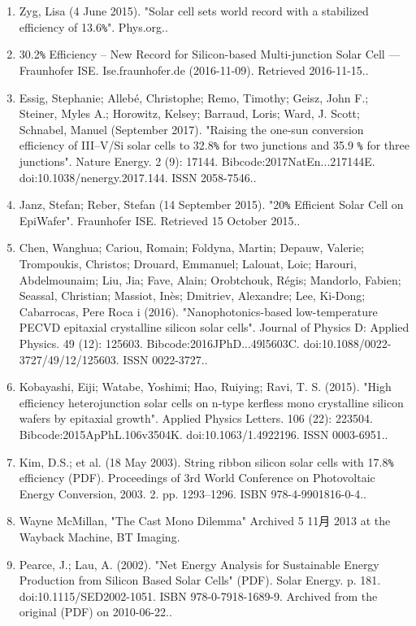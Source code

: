 \begin{enumerate}
\item Zyg, Lisa (4 June 2015). "Solar cell sets world record with a stabilized efficiency of 13.6\verb`%`". Phys.org..
\item 30.2\verb`%` Efficiency – New Record for Silicon-based Multi-junction Solar Cell — Fraunhofer ISE. Ise.fraunhofer.de (2016-11-09). Retrieved 2016-11-15..
\item Essig, Stephanie; Allebé, Christophe; Remo, Timothy; Geisz, John F.; Steiner, Myles A.; Horowitz, Kelsey; Barraud, Loris; Ward, J. Scott; Schnabel, Manuel (September 2017). "Raising the one-sun conversion efficiency of III–V/Si solar cells to 32.8\verb`%` for two junctions and 35.9 \verb`%` for three junctions". Nature Energy. 2 (9): 17144. Bibcode:2017NatEn...217144E. doi:10.1038/nenergy.2017.144. ISSN 2058-7546..
\item Janz, Stefan; Reber, Stefan (14 September 2015). "20\verb`%` Efficient Solar Cell on EpiWafer". Fraunhofer ISE. Retrieved 15 October 2015..
\item Chen, Wanghua; Cariou, Romain; Foldyna, Martin; Depauw, Valerie; Trompoukis, Christos; Drouard, Emmanuel; Lalouat, Loic; Harouri, Abdelmounaim; Liu, Jia; Fave, Alain; Orobtchouk, Régis; Mandorlo, Fabien; Seassal, Christian; Massiot, Inès; Dmitriev, Alexandre; Lee, Ki-Dong; Cabarrocas, Pere Roca i (2016). "Nanophotonics-based low-temperature PECVD epitaxial crystalline silicon solar cells". Journal of Physics D: Applied Physics. 49 (12): 125603. Bibcode:2016JPhD...49l5603C. doi:10.1088/0022-3727/49/12/125603. ISSN 0022-3727..
\item Kobayashi, Eiji; Watabe, Yoshimi; Hao, Ruiying; Ravi, T. S. (2015). "High efficiency heterojunction solar cells on n-type kerfless mono crystalline silicon wafers by epitaxial growth". Applied Physics Letters. 106 (22): 223504. Bibcode:2015ApPhL.106v3504K. doi:10.1063/1.4922196. ISSN 0003-6951..
\item Kim, D.S.; et al. (18 May 2003). String ribbon silicon solar cells with 17.8\verb`%` efficiency (PDF). Proceedings of 3rd World Conference on Photovoltaic Energy Conversion, 2003. 2. pp. 1293–1296. ISBN 978-4-9901816-0-4..
\item Wayne McMillan, "The Cast Mono Dilemma" Archived 5 11月 2013 at the Wayback Machine, BT Imaging.
\item Pearce, J.; Lau, A. (2002). "Net Energy Analysis for Sustainable Energy Production from Silicon Based Solar Cells" (PDF). Solar Energy. p. 181. doi:10.1115/SED2002-1051. ISBN 978-0-7918-1689-9. Archived from the original (PDF) on 2010-06-22..

\end{enumerate}
